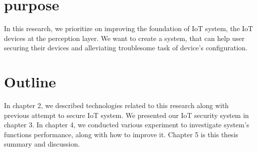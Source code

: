 \section{purpose}
In this research, we prioritize on improving the foundation of IoT system, the IoT devices at the perception layer. We want to create a system, that can help user securing their devices and alleviating troublesome task of device’s configuration.  


\section{Outline}
In chapter 2, we described technologies related to this research along with previous attempt to secure IoT system. We presented our IoT security system in chapter 3. In chapter 4, we conducted various experiment to investigate system’s functions performance, along with how to improve it. Chapter 5 is this thesis summary and discussion.  